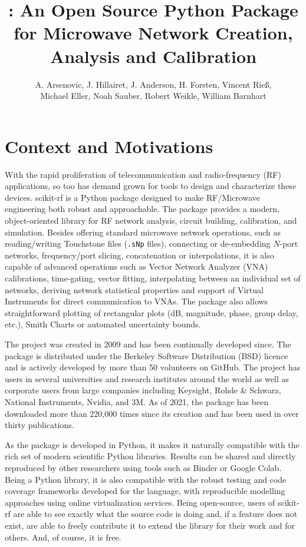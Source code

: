 \documentclass[10pt, letterpaper]{scrartcl}
\title{\skrf{}: An Open Source Python Package for Microwave Network Creation, Analysis and Calibration}
\author{A. Arsenovic, %
	    J. Hillairet, %
		J. Anderson, %
		H. Forsten, %
		Vincent Rieß, \\ %
 		Michael Eller, %
		Noah Sauber, %
		Robert Weikle, %
		William Barnhart %
	}
\date{}
\newcommand{\skrf}{{s}cikit-rf\xspace}
\begin{document}
\maketitle

\section{Context and Motivations}
With the rapid proliferation of telecommunication and radio-frequency (RF) applications, so too has demand grown for tools to design and characterize these devices. \skrf{} is a Python package designed to make RF/Microwave engineering both robust and approachable. The package provides a modern, object-oriented library for RF network analysis, circuit building, calibration, and simulation. Besides offering standard microwave network operations, such as reading/writing Touchstone files (\texttt{.sNp} files), connecting or de-embedding $N$-port networks, frequency/port slicing, concatenation or interpolations, it is also capable of advanced operations such as Vector Network Analyzer (VNA) calibrations, time-gating, vector fitting, interpolating between an individual set of networks, deriving network statistical properties and support of Virtual Instruments for direct communication to VNAs. The package also allows straightforward plotting of rectangular plots (dB, magnitude, phase, group delay, etc.), Smith Charts or automated uncertainty bounds.
 
The project was created in 2009 and has been continually developed since. The package is distributed under the Berkeley Software Distribution (BSD) licence and is actively developed by more than 50 volunteers on GitHub. The project has users in several universities and research institutes around the world as well as corporate users from large companies including Keysight, Rohde \& Schwarz, National Instruments, Nvidia, and 3M. As of 2021, the package has been downloaded more than 220,000 times since its creation and has been used in over thirty publications.

As the package is developed in Python, it makes it naturally compatible with the rich set of modern scientific Python libraries. Results can be shared and directly reproduced by other researchers using tools such as Binder or Google Colab. Being a Python library, it is also compatible with the robust testing and code coverage frameworks developed for the language, with reproducible modelling approaches using online virtualization services. Being open-source, users of \skrf{} are able to see exactly what the source code is doing and, if a feature does not exist, are able to freely contribute it to extend the library for their work and for others. And, of course, it is free.
\end{document}
